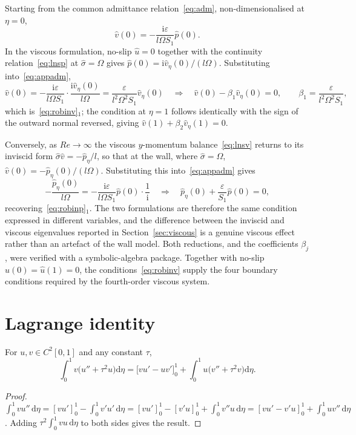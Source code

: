 \documentclass[11pt,a4paper]{article}
\newcommand{\Om}{\Omega}
\newcommand{\eps}{\varepsilon}
\newcommand{\ii}{\mathrm{i}}
\newcommand{\dd}{\mathrm{d}}
\newcommand{\Rey}{\mathit{Re}}
\newcommand{\sig}{\hat\sigma}
\theoremstyle{plain}
\theoremstyle{remark}
\begin{document}
Starting from the common admittance relation~\eqref{eq:adm}, non-dimensionalised at $\eta=0$,
\begin{equation}
\hat v(0)=-\frac{\ii\eps}{l\Om S_1}\hat p(0).
\label{eq:appadm}
\end{equation}
In the viscous formulation, no-slip $\hat u=0$ together with the continuity
relation~\eqref{eq:lnsp} at $\sig=\Om$ gives $\hat p(0)=\ii\hat v_\eta(0)/(l\Om)$. Substituting
into~\eqref{eq:appadm},
\begin{equation}
\hat v(0)=-\frac{\ii\eps}{l\Om S_1}\cdot\frac{\ii\hat v_\eta(0)}{l\Om}
=\frac{\eps}{l^2\Om^2S_1}\hat v_\eta(0)
\quad\Longrightarrow\quad
\hat v(0)-\beta_1\hat v_\eta(0)=0,\qquad \beta_1=\frac{\eps}{l^2\Om^2S_1},
\end{equation}
which is~\eqref{eq:robinv}$_1$; the condition at $\eta=1$ follows identically with the sign of the
outward normal reversed, giving $\hat v(1)+\beta_2\hat v_\eta(1)=0$.

Conversely, as $\Rey\to\infty$ the viscous $y$-momentum balance~\eqref{eq:lnsv} returns to its
inviscid form $\sig\hat v=-\hat p_\eta/l$, so that at the wall, where $\sig=\Om$,
$\hat v(0)=-\hat p_\eta(0)/(l\Om)$. Substituting this into~\eqref{eq:appadm} gives
\begin{equation}
-\frac{\hat p_\eta(0)}{l\Om}=-\frac{\ii\eps}{l\Om S_1}\hat p(0)\cdot\frac{1}{\ii}
\quad\Longrightarrow\quad
\hat p_\eta(0)+\frac{\eps}{S_1}\hat p(0)=0,
\end{equation}
recovering~\eqref{eq:robinp}$_1$. The two formulations are therefore the same condition expressed in
different variables, and the difference between the inviscid and viscous eigenvalues reported in
Section~\ref{sec:viscous} is a genuine viscous effect rather than an artefact of the wall model. Both
reductions, and the coefficients $\beta_j$, were verified with a symbolic-algebra package. Together
with no-slip $\hat u(0)=\hat u(1)=0$, the conditions~\eqref{eq:robinv} supply the four boundary
conditions required by the fourth-order viscous system.

\section{Lagrange identity}\label{app:lagrange}

For $u,v\in C^2[0,1]$ and any constant $\tau$,
\begin{equation}
\int_0^1v\bigl(u''+\tau^2u\bigr)\dd\eta=\bigl[vu'-uv'\bigr]_0^1+\int_0^1u\bigl(v''+\tau^2v\bigr)\dd\eta .
\end{equation}
\begin{proof}
$\int_0^1vu''\,\dd\eta=[vu']_0^1-\int_0^1v'u'\,\dd\eta
=[vu']_0^1-[v'u]_0^1+\int_0^1v''u\,\dd\eta=[vu'-v'u]_0^1+\int_0^1uv''\,\dd\eta$.
Adding $\tau^2\int_0^1vu\,\dd\eta$ to both sides gives the result.
\end{proof}
\end{document}
